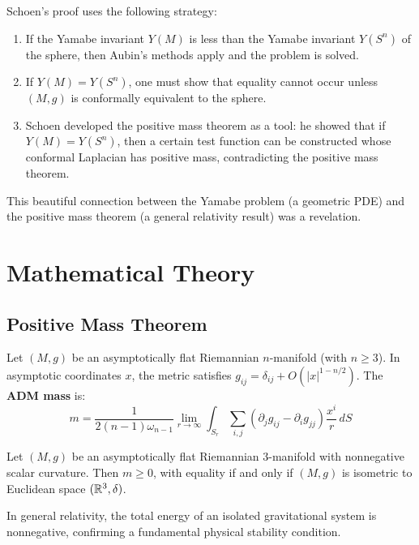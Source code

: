 Schoen's proof uses the following strategy:
\begin{enumerate}
    \item If the Yamabe invariant $Y(M)$ is less than the Yamabe invariant $Y(S^n)$ of the sphere, then Aubin's methods apply and the problem is solved.
    \item If $Y(M) = Y(S^n)$, one must show that equality cannot occur unless $(M,g)$ is conformally equivalent to the sphere.
    \item Schoen developed the positive mass theorem as a tool: he showed that if $Y(M) = Y(S^n)$, then a certain test function can be constructed whose conformal Laplacian has positive mass, contradicting the positive mass theorem.
\end{enumerate}

This beautiful connection between the Yamabe problem (a geometric PDE) and the positive mass theorem (a general relativity result) was a revelation.

\section{Mathematical Theory}

\subsection{Positive Mass Theorem}

\begin{definition}
Let $(M, g)$ be an asymptotically flat Riemannian $n$-manifold (with $n \geq 3$). In asymptotic coordinates $x$, the metric satisfies $g_{ij} = \delta_{ij} + O(|x|^{1-n/2})$. The \textbf{ADM mass} is:
\[
m = \frac{1}{2(n-1)\omega_{n-1}} \lim_{r\to\infty} \int_{S_r} \sum_{i,j} (\partial_j g_{ij} - \partial_i g_{jj}) \frac{x^i}{r} \, dS
\]
\end{definition}

\begin{theorem}
Let $(M,g)$ be an asymptotically flat Riemannian $3$-manifold with nonnegative scalar curvature. Then $m \geq 0$, with equality if and only if $(M,g)$ is isometric to Euclidean space $(\mathbb{R}^3, \delta)$.
\end{theorem}

\begin{corollary}
In general relativity, the total energy of an isolated gravitational system is nonnegative, confirming a fundamental physical stability condition.
\end{corollary}

